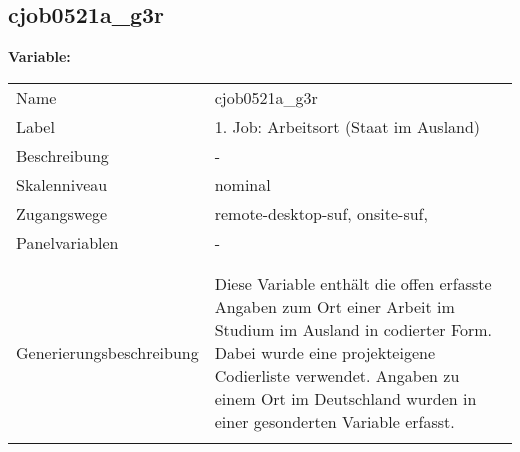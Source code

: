 	
	
	\subsection{cjob0521a\_g3r}
	\label{subSection:cjob0521a_g3r}

	\noindent\textbf{Variable:}\\
		\begin{tabular}{lL{11.3cm}}
			\label{tableVariable:cjob0521a_g3r}
			Name & cjob0521a\_g3r \\
			Label & 1. Job: Arbeitsort (Staat im Ausland) \\
			Beschreibung & - \\
			Skalenniveau & nominal \\
			Zugangswege &
				remote-desktop-suf,
				onsite-suf,
 \\
			Panelvariablen & -
			 \\
			 \\
 \\
					Generierungsbeschreibung & Diese Variable enthält die offen erfasste Angaben zum Ort einer Arbeit im Studium im Ausland in codierter Form. Dabei wurde eine projekteigene Codierliste verwendet. Angaben zu einem Ort im Deutschland wurden in einer gesonderten Variable erfasst. 
				 \\	
			 \\
		\end{tabular}






